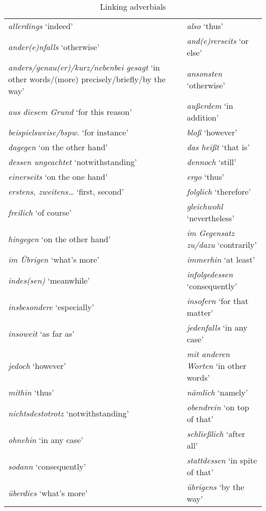 \documentclass[output=paper]{LSP/langsci}
\begin{document}
\begin{table}
  \caption{Linking adverbials}\label{bisiada:tab:linadvs}
  \begin{tabularx}{\textwidth}{QQ}
    \lsptoprule
    \emph{allerdings} `indeed' & \emph{also} `thus'\\
    \emph{ander(e)nfalls} `otherwise' & \emph{and(e)rerseits} `or else'\\
    \emph{anders\slash genau(er)\slash kurz\slash nebenbei gesagt} `in other words\slash (more) precisely\slash briefly\slash by the way' & \emph{ansonsten} `otherwise'\\
    \emph{aus diesem Grund} `for this reason' & \emph{außerdem} `in addition'\\
    \emph{beispielsweise/bspw.} `for instance' & \emph{bloß} `however'\\
    \emph{dagegen} `on the other hand' & \emph{das heißt} `that is'\\
    \emph{dessen ungeachtet} `notwithstanding' & \emph{dennoch} `still'\\
    \emph{einerseits} `on the one hand' & \emph{ergo} `thus'\\
    \emph{erstens, zweitens\dots} `first, second' & \emph{folglich} `therefore'\\
    \emph{freilich} `of course' & \emph{gleichwohl} `nevertheless'\\
    \emph{hingegen} `on the other hand' & \emph{im Gegensatz zu\slash dazu} `contrarily'\\
    \emph{im Übrigen} `what's more' & \emph{immerhin} `at least'\\
    \emph{indes(sen)} `meanwhile' & \emph{infolgedessen} `consequently'\\
    \emph{insbesondere} `especially' & \emph{insofern} `for that matter'\\
    \emph{insoweit} `as far as' & \emph{jedenfalls} `in any case'\\
    \emph{jedoch} `however' & \emph{mit anderen Worten} `in other words'\\
    \emph{mithin} `thus' & \emph{nämlich} `namely'\\
    \emph{nichtsdestotrotz} `notwithstanding' & \emph{obendrein} `on top of that'\\
    \emph{ohnehin} `in any case' & \emph{schließlich} `after all'\\
    \emph{sodann} `consequently' & \emph{stattdessen} `in spite of that'\\
    \emph{überdies} `what's more' & \emph{übrigens} `by the way'\\

\end{tabularx}
\end{table}
\end{document}
